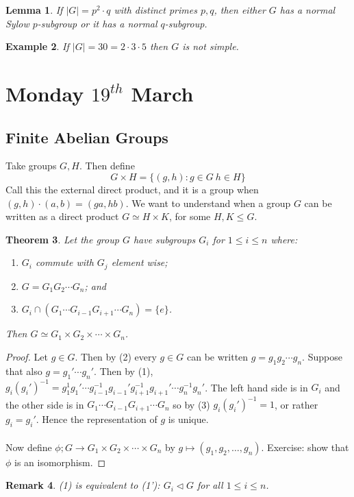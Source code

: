 \documentclass[a4paper,10pt]{article}
\newtheorem{thm}{Theorem}
\newtheorem{eg}[thm]{Example}
\newtheorem{Lem}[thm]{Lemma}
\newtheorem{rem}[thm]{Remark}
\begin{document}
\begin{Lem}
If $|G| = p^2 \cdot q$ with distinct primes $p,q$, then either $G$ has a normal Sylow $p$-subgroup or it has a normal $q$-subgroup.
\end{Lem}

\begin{eg}
If $|G| = 30 = 2 \cdot 3 \cdot 5$ then $G$ is not simple.
\end{eg}












\newpage
\section{Monday $19^{th}$ March}

\subsection{Finite Abelian Groups}

Take groups $G,H$. Then define
\[ G \times H = \{ (g ,h) : g \in G \ h \in H \} \]
Call this the external direct product, and it is a group when  $(g,h) \cdot (a,b) = (ga, hb)$. We want to understand when a group $G$ can be written as a direct product $G \simeq H \times K$, for some $H, K \leq G$.  

\begin{thm}
Let the group $G$ have subgroups $G_i$ for $1 \leq i \leq n$ where:
\begin{enumerate}
\item $G_i$ commute with $G_j$ element wise;
\item $G = G_1 G_2 \cdots G_n$; and
\item $G_i \cap (G_1 \cdots G_{i-1}G_{i+1} \cdots G_n) = \{e\}$.
\end{enumerate}
Then $G \simeq G_1 \times G_2 \times \cdots \times G_n$. 
\end{thm}

\begin{proof}
Let $g \in G$. Then by (2) every $g \in G$ can be written $g = g_1 g_2 \cdots g_n$. Suppose that also $g = g_1 ' \cdots g_n '$. Then by (1), $g_i  (g_i')^{-1} = g_1^{1} g_1' \cdots g_{i-1}^{-1} g_{i-1}' g_{i+1}^{-1} g_{i+1}' \cdots g_n^{-1} g_n'$. The left hand side is in $G_i$ and the other side is in $G_1 \cdots G_{i-1}G_{i+1} \cdots G_n$ so by (3) $g_i (g_i')^{-1} = 1$, or rather $g_i = g_i '$. Hence the representation of $g$ is unique. \\
\\
Now define $\phi ; G \rightarrow G_1 \times G_2 \times \cdots \times G_n$ by $g \mapsto (g_1, g_2, \dots, g_n)$. Exercise: show that $\phi$ is an isomorphism. 
\end{proof}
\begin{rem}
(1) is equivalent to (1'): $G_i \triangleleft G$ for all $1 \leq i \leq n$. 
\end{rem}
\end{document}
